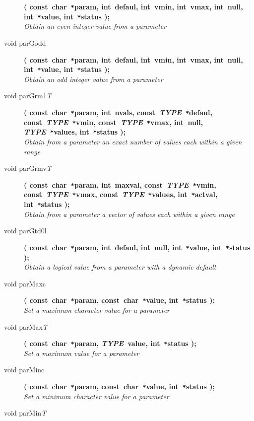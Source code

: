 \documentclass[twoside,11pt,nolof]{starlink}
\begin{document}
\begin{flushleft}
\begin{description}
\textbf{( const~char~\texttt{*}param, int~defaul, int~vmin, int~vmax,
               int~null, int~\texttt{*}value, int~\texttt{*}status );} \\
\textit{Obtain an even integer value from a parameter}
\item[void parGodd]
\textbf{( const~char~\texttt{*}param, int~defaul, int~vmin, int~vmax,
              int~null, int~\texttt{*}value, int~\texttt{*}status );} \\
\textit{Obtain an odd integer value from a parameter}
\item[void parGrm1\textit{T}]
\textbf{( const~char~\texttt{*}param, int~nvals,
               const~\textit{TYPE}~\texttt{*}defaul,
               const~\textit{TYPE}~\texttt{*}vmin,
               const~\textit{TYPE}~\texttt{*}vmax, int~null,
               \textit{TYPE}~\texttt{*}values, int~\texttt{*}status );} \\
\textit{Obtain from a parameter an exact number of values each within a
            given range}
\item[void parGrmv\textit{T}]
\textbf{( const~char~\texttt{*}param, int~maxval,
               const~\textit{TYPE}~\texttt{*}vmin,
               const~\textit{TYPE}~\texttt{*}vmax,
               const~\textit{TYPE}~\texttt{*}values, int~\texttt{*}actval,
               int~\texttt{*}status );} \\
\textit{Obtain from a parameter a vector of values each within a given
            range}
\item[void parGtd0l]
\textbf{( const~char~\texttt{*}param, int~defaul, int~null,
          int~\texttt{*}value, int~\texttt{*}status );}\\
\textit{Obtain a logical value from a parameter with a dynamic default}
\item[void parMaxc]
\textbf{( const~char~\texttt{*}param, const~char~\texttt{*}value,
          int~\texttt{*}status );}\\
\textit{Set a maximum character value for a parameter}
\item[void parMax\textit{T}]
\textbf{( const~char~\texttt{*}param, \textit{TYPE}~value,
          int~\texttt{*}status );}\\
\textit{Set a maximum value for a parameter}
\item[void parMinc]
\textbf{( const~char~\texttt{*}param, const~char~\texttt{*}value,
          int~\texttt{*}status );}\\
\textit{Set a minimum character value for a parameter}
\item[void parMin\textit{T}]

\end{description}
\end{flushleft}
\end{document}
